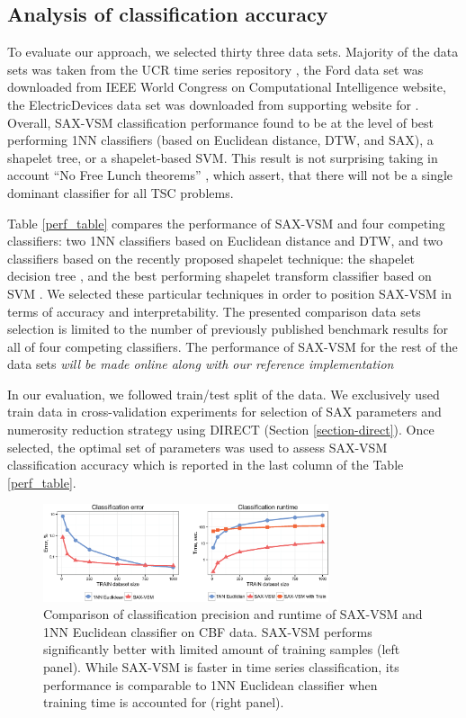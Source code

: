 \documentclass[conference]{IEEEtran}
\newcommand{\myfigureshrinkerless}{\vspace{-0.05cm}}
\begin{document}
\subsection{Analysis of classification accuracy}
To evaluate our approach, we selected thirty three data sets. Majority of the data sets was taken 
from the UCR time series repository \cite{ucr}, the Ford data set was downloaded from 
IEEE World Congress on Computational Intelligence \cite{ford} website, the 
ElectricDevices data set was downloaded from supporting website for \cite{bagnal}. 
Overall, SAX-VSM classification performance found to be at the level of best 
performing 1NN classifiers (based on Euclidean distance, DTW, and SAX), 
a shapelet tree, or a shapelet-based SVM. 
This result is not surprising taking in account ``No Free Lunch theorems'' \cite{nfl}, 
which assert, that there will not be a single dominant classifier for all TSC problems.

Table \ref{perf_table} compares the performance of SAX-VSM and four competing 
classifiers: two 1NN classifiers based on Euclidean distance and DTW, 
and two classifiers based on the recently proposed shapelet technique: 
the shapelet decision tree \cite{shapelet, logical}, and 
the best performing shapelet transform classifier based on SVM \cite{bagnal}. 
We selected these particular techniques in order to position SAX-VSM 
in terms of accuracy and interpretability. 
The presented comparison data sets selection is limited to the number 
of previously published benchmark results for all of four competing classifiers. 
The performance of SAX-VSM for the rest of the data sets \textit{will be made online
 along with our reference implementation}

In our evaluation, we followed train/test split of the data. We exclusively used train data in 
cross-validation experiments for selection of SAX parameters and numerosity reduction strategy
using DIRECT (Section \ref{section-direct}). Once selected, the optimal set of parameters 
was used to assess SAX-VSM classification accuracy which is reported in the last column 
of the Table \ref{perf_table}.

\begin{figure}[t]
   \myfigureshrinkerless
   \centering
   \includegraphics[width=84mm]{figures/precision-runtime.eps}
   \caption{Comparison of classification precision and runtime of SAX-VSM and 1NN 
   Euclidean classifier on CBF data. SAX-VSM performs significantly better with limited 
   amount of training samples (left panel). While SAX-VSM is faster in time series 
   classification, its performance is comparable to 1NN Euclidean classifier when 
   training time is accounted for (right panel).}
   \label{fig:precision-runtime}
\end{figure}
\end{document}
